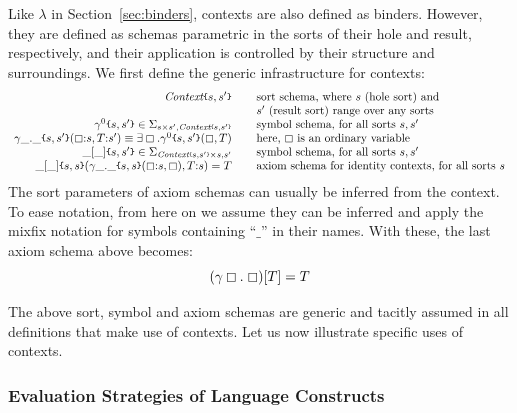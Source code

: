\documentclass[UTF8,11pt]{article}
\theoremstyle{plain}
\theoremstyle{definition}
\theoremstyle{remark}
\newcommand{\cln}{{:}}
\newcommand{\Context}{\textit{Context}}
\newcommand{\hole}{\boxempty}
\newcommand{\parametric}[2]{{#1}\raisebox{.2ex}{\texttt{\footnotesize{\{}}}#2\raisebox{.2ex}{\texttt{\footnotesize{\}}}}}
\newcommand{\parametricscript}[2]{{#1}\raisebox{.2ex}{\texttt{\tiny{\{}}}#2\raisebox{.2ex}{\texttt{\tiny{\}}}}}
\begin{document}
Like $\lambda$ in Section~\ref{sec:binders}, contexts are also defined
as binders.
However, they are defined as schemas parametric in the sorts of their
hole and result, respectively, and their application is controlled by
their structure and surroundings.
We first define the generic infrastructure for contexts:
$$
\begin{array}{r@{\hspace*{5ex}}l}
\parametric{\Context}{s,s'} &
\textrm{sort schema, where $s$ (hole sort) and}
\\ &\textrm{$s'$ (result sort) range over any sorts}
\\ \parametric{\gamma^0}{s,s'} \in \Sigma_{s \times s', \parametricscript{\Context}{s,s'}}
& \textrm{symbol schema, for all sorts $s, s'$}
\\ \parametric{\gamma\_.\_}{s,s'}(\hole\cln s,T\cln s') \equiv \exists \hole . \parametric{\gamma^0}{s,s'}(\hole,T)
& \textrm{here, $\hole$ is an ordinary variable}
\\
\parametric{\_[\_]}{s,s'} \in \Sigma_{\parametricscript{\Context}{s,s'} \times s, s'}
& \textrm{symbol schema, for all sorts $s, s'$}
\\
\parametric{\_[\_]}{s,s}(\parametric{\gamma\_.\_}{s,s}(\hole\cln s, \hole),T\cln s) = T
& \textrm{axiom schema for identity contexts, for all sorts $s$}
\end{array}
$$
The sort parameters of axiom schemas can usually be inferred from the context.
To ease notation, from here on we assume they can be inferred and apply the
mixfix notation for symbols containing ``$\_$'' in their names.
With these, the last axiom schema above becomes:
$$
(\gamma \hole .\; \hole)[T] = T
$$

The above sort, symbol and axiom schemas are generic and tacitly assumed in
all definitions that make use of contexts.
Let us now illustrate specific uses of contexts.

\subsubsection{Evaluation Strategies of Language Constructs}
\end{document}
